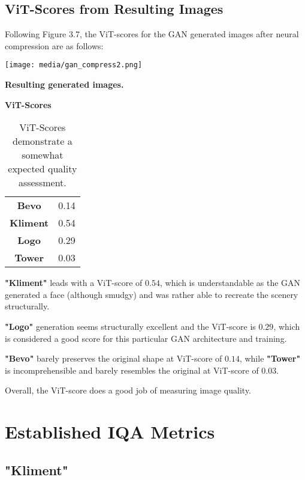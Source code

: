 \subsection{ViT-Scores from Resulting Images}


Following Figure 3.7, the ViT-scores for the GAN generated images after neural compression
are as follows:

\begin{center}
	\texttt{[image: media/gan\_compress2.png]}

    \textbf{Resulting generated images.}
\end{center}

\textbf{ViT-Scores}

\begin{table}[H]
\begin{center}
\begin{tabular}{|c|c|}
\hline
\textbf{Bevo}	& 0.14\\
\textbf{Kliment}	& 0.54\\
\textbf{Logo}	& 0.29\\
\textbf{Tower} & 0.03\\\hline

\end{tabular}
\caption[ViT-Scores of Generated Images]{ViT-Scores demonstrate a somewhat expected quality assessment.}
\end{center}
\end{table}



\textbf{"Kliment"} leads with a ViT-score of $0.54$, which is understandable as the GAN 
generated a face (although smudgy) and was rather able to recreate the scenery structurally.

\textbf{"Logo"} generation seems structurally excellent and the ViT-score is $0.29$, which
is considered a good score for this particular GAN architecture and training.

\textbf{"Bevo"} barely preserves the original shape at ViT-score of $0.14$, while
\textbf{"Tower"} is incomprehensible and barely resembles the original at ViT-score of $0.03$.


Overall, the ViT-score does a good job of measuring image quality.


\section{Established IQA Metrics}

\subsection{"Kliment"}

